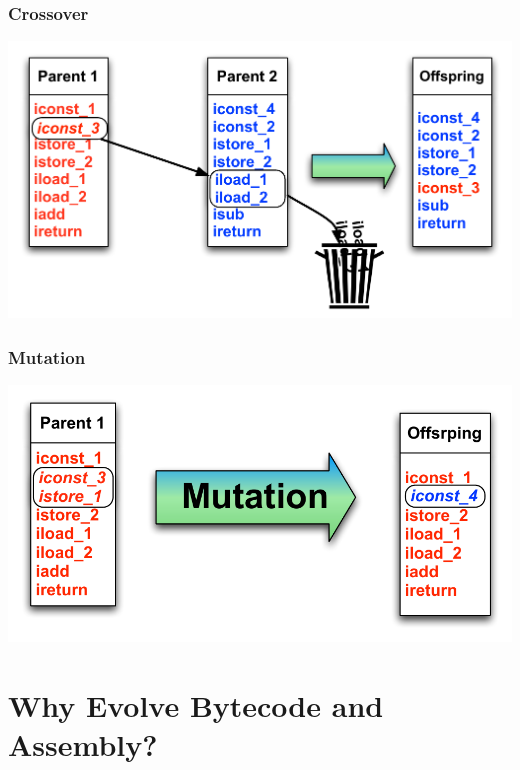 \documentclass{beamer}
\begin{document}
\begin{frame}
	\frametitle{Crossover}

   \includegraphics[width=1\textwidth]{Illustrations/crossover.pdf}
       \\

\end{frame}

\begin{frame}
	\frametitle{Mutation}

   \includegraphics[width=1\textwidth]{Illustrations/mutation.pdf}
       \\

\end{frame}


\section[Why]{Why Evolve Bytecode and Assembly?}
\end{document}
